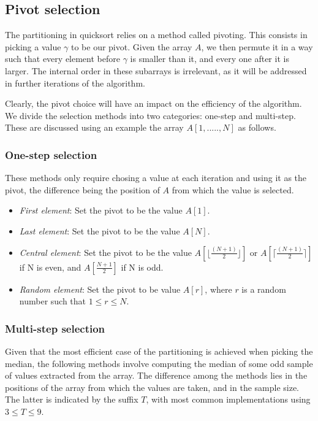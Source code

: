 \documentclass[]{finalproject}
\begin{document}
\subsection{Pivot selection}
The partitioning in quicksort relies on a method called pivoting. This consists in picking a value $\gamma$ to be our pivot. Given the array $A$, we then permute it in a way such that every element before $\gamma$ is smaller than it, and every one after it is larger. The internal order in these subarrays is irrelevant, as it will be addressed in further iterations of the algorithm.

Clearly, the pivot choice will have an impact on the efficiency of the algorithm. We divide the selection methods into two categories: one-step and multi-step. These are discussed using an example the array $A[1,.....,N]$ as follows.

\subsubsection{One-step selection}
These methods only require chosing a value at each iteration and using it as the pivot, the difference being the position of $A$ from which the value is selected.

\begin{itemize}
\item \textit{First element}: Set the pivot to be the value $A[1]$.
\item \textit{Last element}: Set the pivot to be the value $A[N]$.
\item \textit{Central element}: Set the pivot to be the value $A[\lfloor \frac{(N+1)}{2} \rfloor]$ or $A[\lceil \frac{(N+1)}{2} \rceil]$ if N is even, and $A[\frac{N+1}{2}]$ if N is odd.
\item \textit{Random element}: Set the pivot to be value $A[r]$, where $r$ is a random number such that $1 \leq r \leq N$.
\end{itemize}

\subsubsection{Multi-step selection}
Given that the most efficient case of the partitioning is achieved when picking the median, the following methods involve computing the median of some odd sample of values extracted from the array. The difference among the methods lies in the positions of the array from which the values are taken, and in the sample size. The latter is indicated by the suffix $T$, with most common implementations using $3 \leq T \leq 9$.
\end{document}
